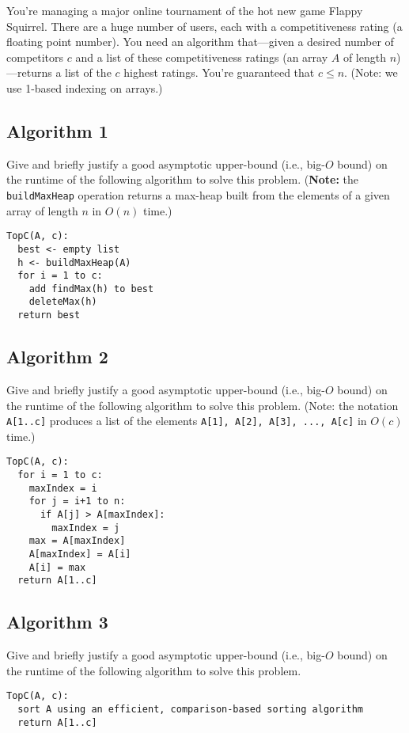 \documentclass[11pt, oneside]{article}   	%
\theoremstyle{definition}
\theoremstyle{remark}
\begin{document}
You're managing a major online tournament of the hot new game Flappy
Squirrel. There are a huge number of users, each with a
competitiveness rating (a floating point number). You need an
algorithm that---given a desired number of competitors $c$ and a list
of these competitiveness ratings (an array $A$ of length
$n$)---returns a list of the $c$ highest ratings. You're guaranteed
that $c \leq n$. (Note: we use 1-based indexing on arrays.)
\subsection{Algorithm 1}

Give and briefly justify a good asymptotic upper-bound (i.e., big-$O$
bound) on the runtime of the following algorithm to solve this
problem. (\textbf{Note:} the \texttt{buildMaxHeap} operation returns a max-heap
built from the elements of a given array of length $n$ in $O(n)$
time.)

\begin{verbatim}
TopC(A, c):
  best <- empty list
  h <- buildMaxHeap(A)
  for i = 1 to c:
    add findMax(h) to best
    deleteMax(h)
  return best
\end{verbatim}
\subsection{Algorithm 2}

Give and briefly justify a good asymptotic upper-bound (i.e., big-$O$
bound) on the runtime of the following algorithm to solve this
problem. (Note: the notation \texttt{A[1..c]} produces a list of the elements
\texttt{A[1], A[2], A[3], ..., A[c]} in $O(c)$ time.)

\begin{verbatim}
TopC(A, c):
  for i = 1 to c:
    maxIndex = i
    for j = i+1 to n:
      if A[j] > A[maxIndex]:
        maxIndex = j
    max = A[maxIndex]
    A[maxIndex] = A[i]
    A[i] = max
  return A[1..c]
\end{verbatim}
\subsection{Algorithm 3}

Give and briefly justify a good asymptotic upper-bound (i.e., big-$O$
bound) on the runtime of the following algorithm to solve this
problem.

\begin{verbatim}
TopC(A, c):
  sort A using an efficient, comparison-based sorting algorithm
  return A[1..c]
\end{verbatim}
\end{document}
